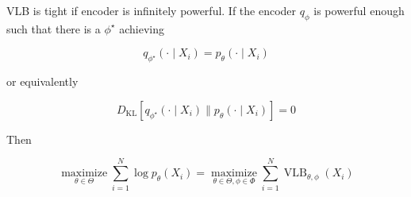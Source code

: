 \begin{frame}[allowframebreaks]

\begin{myconceptblock}{11.15}{VLB is tight if encoder is infinitely powerful.}
    If the encoder $q_{\phi}$ is powerful enough such that there is a $\phi^{\star}$ achieving

    $$
    q_{\phi^{\star}}\left(\cdot \mid X_{i}\right)=p_{\theta}\left(\cdot \mid X_{i}\right)
    $$

    or equivalently

    $$
    D_{\mathrm{KL}}\left[q_{\phi^{\star}}\left(\cdot \mid X_{i}\right) \| p_{\theta}\left(\cdot \mid X_{i}\right)\right]=0
    $$

    Then

    $$
    \underset{\theta \in \Theta}{\operatorname{maximize}} \sum_{i=1}^{N} \log p_{\theta}\left(X_{i}\right)=\underset{\theta \in \Theta, \phi \in \Phi}{\operatorname{maximize}} \sum_{i=1}^{N} \operatorname{VLB}_{\theta, \phi}\left(X_{i}\right)
    $$
\end{myconceptblock}

\end{frame}


